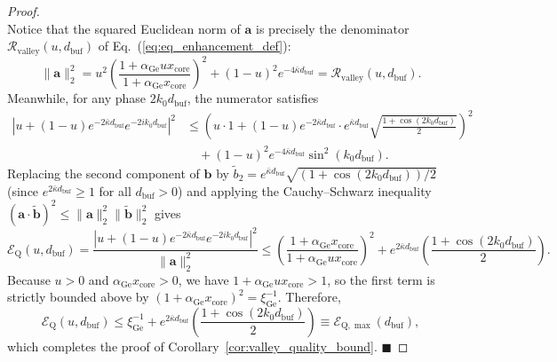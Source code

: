 \documentclass[11pt,letterpaper]{article}
\theoremstyle{definition}
\begin{document}
\begin{proof}
\begin{equation}
  \label{eq:appB_cs_vectors}
\end{equation}
Notice that the squared Euclidean norm of $\mathbf{a}$ is precisely the denominator $\mathcal{R}_{\mathrm{valley}}(u, d_{\mathrm{buf}})$ of Eq.~(\ref{eq:eq_enhancement_def}):
\begin{equation}
  \|\mathbf{a}\|_2^2 = u^2 \left(\frac{1 + \alpha_{\mathrm{Ge}} u x_{\mathrm{core}}}{1 + \alpha_{\mathrm{Ge}} x_{\mathrm{core}}}\right)^2 + (1 - u)^2 e^{-4\bar{\kappa} d_{\mathrm{buf}}} = \mathcal{R}_{\mathrm{valley}}(u, d_{\mathrm{buf}}).
  \label{eq:appB_norm_a}
\end{equation}
Meanwhile, for any phase $2k_0 d_{\mathrm{buf}}$, the numerator satisfies
\begin{equation}
\begin{aligned}
  \left| u + (1 - u) e^{-2\bar{\kappa} d_{\mathrm{buf}}} e^{-2i k_0 d_{\mathrm{buf}}} \right|^2 &\le \left( u \cdot 1 + (1 - u) e^{-2\bar{\kappa} d_{\mathrm{buf}}} \cdot e^{\bar{\kappa} d_{\mathrm{buf}}} \sqrt{\frac{1 + \cos(2k_0 d_{\mathrm{buf}})}{2}} \right)^2 \\
  &\quad + (1-u)^2 e^{-4\bar{\kappa} d_{\mathrm{buf}}} \sin^2(k_0 d_{\mathrm{buf}}).
\end{aligned}
  \label{eq:appB_intermediate}
\end{equation}
Replacing the second component of $\mathbf{b}$ by $\tilde{b}_2 = e^{\bar{\kappa} d_{\mathrm{buf}}} \sqrt{(1 + \cos(2k_0 d_{\mathrm{buf}}))/2}$ (since $e^{2\bar{\kappa} d_{\mathrm{buf}}} \ge 1$ for all $d_{\mathrm{buf}} > 0$) and applying the Cauchy--Schwarz inequality $(\mathbf{a}\cdot\tilde{\mathbf{b}})^2 \le \|\mathbf{a}\|_2^2 \|\tilde{\mathbf{b}}\|_2^2$ gives
\begin{equation}
  \mathcal{E}_{\mathrm{Q}}(u, d_{\mathrm{buf}}) = \frac{\left| u + (1 - u) e^{-2\bar{\kappa} d_{\mathrm{buf}}} e^{-2i k_0 d_{\mathrm{buf}}} \right|^2}{\|\mathbf{a}\|_2^2} \le \left(\frac{1 + \alpha_{\mathrm{Ge}} x_{\mathrm{core}}}{1 + \alpha_{\mathrm{Ge}} u x_{\mathrm{core}}}\right)^2 + e^{2\bar{\kappa} d_{\mathrm{buf}}} \left(\frac{1 + \cos(2k_0 d_{\mathrm{buf}})}{2}\right).
  \label{eq:appB_cs_applied}
\end{equation}
Because $u > 0$ and $\alpha_{\mathrm{Ge}} x_{\mathrm{core}} > 0$, we have $1 + \alpha_{\mathrm{Ge}} u x_{\mathrm{core}} > 1$, so the first term is strictly bounded above by $(1 + \alpha_{\mathrm{Ge}} x_{\mathrm{core}})^2 = \xi_{\mathrm{Ge}}^{-1}$. Therefore,
\begin{equation}
  \mathcal{E}_{\mathrm{Q}}(u, d_{\mathrm{buf}}) \le \xi_{\mathrm{Ge}}^{-1} + e^{2\bar{\kappa} d_{\mathrm{buf}}} \left(\frac{1 + \cos(2k_0 d_{\mathrm{buf}})}{2}\right) \equiv \mathcal{E}_{\mathrm{Q},\max}(d_{\mathrm{buf}}),
  \label{eq:appB_final_bound}
\end{equation}
which completes the proof of Corollary~\ref{cor:valley_quality_bound}. $\blacksquare$
\end{proof}
\end{document}
